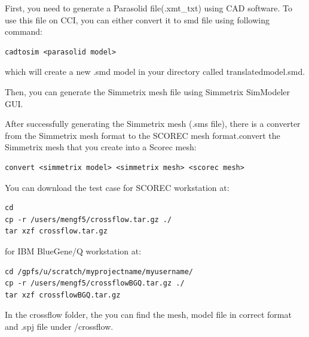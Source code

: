 \documentclass{article}
\begin{document}
First, you need to generate a Parasolid file(.xmt\_txt) using CAD software. To use this file on CCI, you can either convert it to smd file using following command:
\begin{lstlisting}
cadtosim <parasolid model> 
\end{lstlisting}
which will create a new .smd model in your directory called translatedmodel.smd.

Then, you can generate the Simmetrix mesh file using Simmetrix SimModeler GUI.

After successfully generating the Simmetrix mesh (.sms file), there is a converter from the Simmetrix mesh format to the SCOREC mesh format.convert the Simmetrix mesh that you create into a Scorec mesh:
\begin{lstlisting}
convert <simmetrix model> <simmetrix mesh> <scorec mesh>
\end{lstlisting}

You can download the test case for SCOREC workstation at:
\begin{lstlisting}
cd
cp -r /users/mengf5/crossflow.tar.gz ./
tar xzf crossflow.tar.gz
\end{lstlisting}
for IBM BlueGene/Q workstation at:
\begin{lstlisting}
cd /gpfs/u/scratch/myprojectname/myusername/
cp -r /users/mengf5/crossflowBGQ.tar.gz ./
tar xzf crossflowBGQ.tar.gz
\end{lstlisting}
In the crossflow folder, the you can find the mesh, model file in correct format and .spj file under /crossflow.
\end{document}
